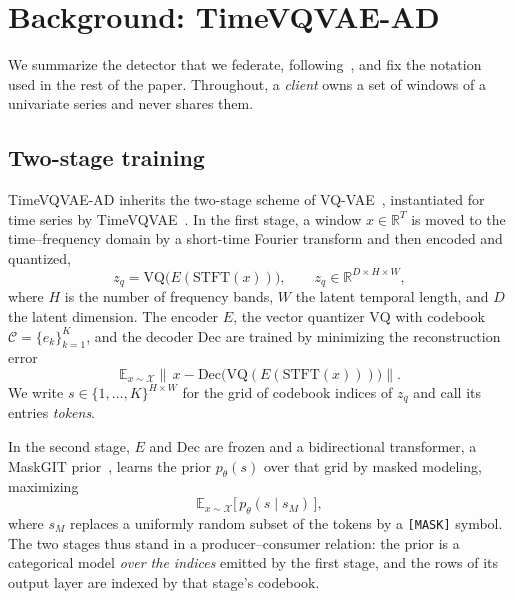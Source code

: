 \documentclass[conference]{IEEEtran}
\begin{document}
\section{Background: TimeVQVAE-AD}
\label{sec:background}

We summarize the detector that we federate, following~\cite{lee2024timevqvaead}, and fix the
notation used in the rest of the paper. Throughout, a \emph{client} owns a set of windows of a
univariate series and never shares them.

\subsection{Two-stage training}

TimeVQVAE-AD inherits the two-stage scheme of VQ-VAE~\cite{van2017neural}, instantiated for time
series by TimeVQVAE~\cite{lee2023timevqvae}. In the first stage, a window $x \in \mathbb{R}^{T}$
is moved to the time--frequency domain by a short-time Fourier transform and then encoded and
quantized,
\begin{equation}
  z_q = \mathrm{VQ}\bigl(E(\mathrm{STFT}(x))\bigr), \qquad z_q \in \mathbb{R}^{D \times H \times W},
  \label{eq:tokenize}
\end{equation}
where $H$ is the number of frequency bands, $W$ the latent temporal length, and $D$ the latent
dimension. The encoder $E$, the vector quantizer $\mathrm{VQ}$ with codebook
$\mathcal{C} = \{e_k\}_{k=1}^{K}$, and the decoder $\mathrm{Dec}$ are trained by minimizing the
reconstruction error
\begin{equation}
  \mathbb{E}_{x \sim \mathcal{X}}\bigl\|\, x - \mathrm{Dec}\bigl(\mathrm{VQ}(E(\mathrm{STFT}(x)))\bigr) \bigr\|.
  \label{eq:stage1}
\end{equation}
We write $s \in \{1,\dots,K\}^{H \times W}$ for the grid of codebook indices of $z_q$ and call its
entries \emph{tokens}.

In the second stage, $E$ and $\mathrm{Dec}$ are frozen and a bidirectional transformer, a MaskGIT
prior~\cite{chang2022maskgit}, learns the prior $p_\theta(s)$ over that grid by masked modeling,
maximizing
\begin{equation}
  \mathbb{E}_{x \sim \mathcal{X}}\bigl[\, p_\theta(s \mid s_M) \,\bigr],
  \label{eq:stage2}
\end{equation}
where $s_M$ replaces a uniformly random subset of the tokens by a \texttt{[MASK]} symbol. The two
stages thus stand in a producer--consumer relation: the prior is a categorical model \emph{over the
indices} emitted by the first stage, and the rows of its output layer are indexed by that stage's
codebook.
\end{document}
